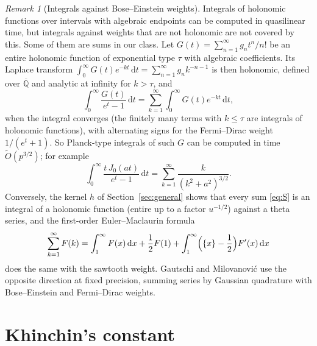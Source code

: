 \documentclass[11pt,reqno]{amsart}
\theoremstyle{definition}
\theoremstyle{remark}
\newtheorem{remark}[theorem]{Remark}
\newcommand{\dd}{\,\mathrm{d}}
\newcommand{\Qbar}{\overline{\mathbb{Q}}}
\begin{document}
\begin{remark}[Integrals against Bose--Einstein weights]\label{rem:bose}
Integrals of holonomic functions over intervals with algebraic endpoints can be computed in quasilinear time,
but integrals against weights that are not holonomic are not covered by this. Some of them are sums in our
class. Let $G(t) = \sum_{n=1}^{\infty}g_nt^n/n!$ be an entire holonomic function of exponential type $\tau$ with algebraic
coefficients. Its Laplace transform $\int_0^\infty G(t)e^{-kt}\dd t = \sum_{n=1}^{\infty}g_nk^{-n-1}$ is then holonomic,
defined over $\Qbar$ and analytic at infinity for $k > \tau$, and
\[
  \int_0^\infty \frac{G(t)}{e^t - 1}\dd t = \sum_{k=1}^{\infty}\int_0^\infty G(t)e^{-kt}\dd t,
\]
when the integral converges (the finitely many terms with $k \le \tau$ are integrals of holonomic functions), with
alternating signs for the Fermi--Dirac weight $1/(e^t+1)$. So Planck-type integrals
of such $G$ can be computed in time $\widetilde O(p^{3/2})$; for example
\[
  \int_0^\infty \frac{t\,J_0(at)}{e^t-1}\dd t = \sum_{k=1}^{\infty}\frac{k}{(k^2+a^2)^{3/2}}.
\]
Conversely, the kernel $h$ of Section~\ref{sec:general} shows that every sum \eqref{eq:S} is an integral of a
holonomic function (entire up to a factor $u^{-1/2}$) against a theta series, and the first-order Euler--Maclaurin
formula
\[
  \sum_{k=1}^{\infty}F(k) = \int_1^\infty F(x)\dd x + \frac12F(1) + \int_1^\infty\Bigl(\{x\}-\frac12\Bigr)F'(x)\dd x
\]
does the same with the sawtooth weight. Gautschi and Milovanovi\'c \cite{GM85} use the opposite direction at fixed precision, summing series by Gaussian
quadrature with Bose--Einstein and Fermi--Dirac weights.
\end{remark}

\section{Khinchin's constant}\label{sec:khinchin}
\end{document}
